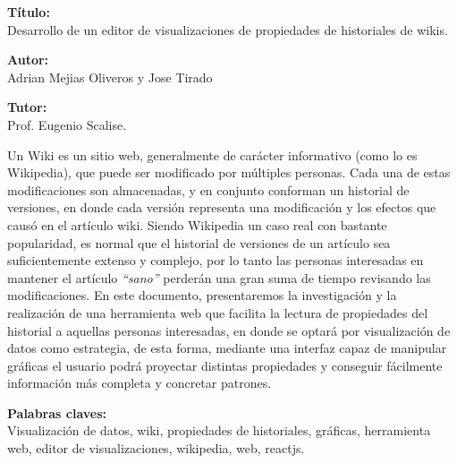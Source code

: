 
  
\textbf{Título:}\\
Desarrollo de un editor de visualizaciones de propiedades de historiales de wikis.

\textbf{Autor:}\\
Adrian Mejias Oliveros y Jose Tirado

\textbf{Tutor:}\\
Prof. Eugenio Scalise.

Un Wiki es un sitio web, generalmente de carácter informativo (como lo es Wikipedia), que puede ser modificado por múltiples personas. Cada una de estas modificaciones son almacenadas, y en conjunto conforman un historial de versiones, en donde cada versión representa una modificación y los efectos que causó en el artículo wiki.
Siendo Wikipedia un caso real con bastante popularidad, es normal que el historial de versiones de un artículo sea suficientemente extenso y complejo, por lo tanto las personas interesadas en mantener el artículo \textit{“sano”} perderán una gran suma de tiempo revisando las modificaciones.
En este documento, presentaremos la investigación y la realización de una herramienta web que facilita la lectura de propiedades del historial a aquellas personas interesadas, en donde se optará por visualización de datos como estrategia, de esta forma, mediante una interfaz capaz de manipular gráficas el usuario podrá proyectar distintas propiedades y conseguir fácilmente información más completa y concretar patrones.


\textbf{Palabras claves:}\\
Visualización de datos, wiki, propiedades de historiales, gráficas, herramienta web, editor de visualizaciones, wikipedia, web, reactjs.